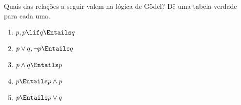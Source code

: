 \documentclass[../../../include/open-logic-section]{subfiles}
\begin{document}
\begin{prob}
  Quais das relações a seguir valem na lógica de G\"odel? Dê uma tabela-verdade para cada uma.
  \begin{enumerate}
    \item $p, p \lif q \Entails q$
    \item $p \lor q, \lnot p \Entails q$
    \item $p \land q \Entails p$
    \item $p \Entails p \land p$
    \item $p \Entails p \lor q$
  \end{enumerate}
\end{prob}
\end{document}
